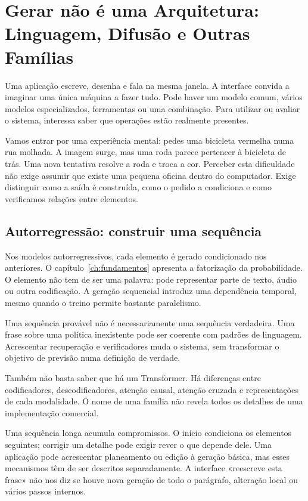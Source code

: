 \chapter{Gerar não é uma Arquitetura: Linguagem, Difusão e Outras Famílias}
\label{ch:generativos}

Uma aplicação escreve, desenha e fala na mesma janela. A interface convida a imaginar uma única máquina a fazer tudo. Pode haver um modelo comum, vários modelos especializados, ferramentas ou uma combinação. Para utilizar ou avaliar o sistema, interessa saber que operações estão realmente presentes.

Vamos entrar por uma experiência mental: pedes uma bicicleta vermelha numa rua molhada. A imagem surge, mas uma roda parece pertencer à bicicleta de trás. Uma nova tentativa resolve a roda e troca a cor. Perceber esta dificuldade não exige assumir que existe uma pequena oficina dentro do computador. Exige distinguir como a saída é construída, como o pedido a condiciona e como verificamos relações entre elementos.

\section{Autorregressão: construir uma sequência}
Nos modelos autorregressivos, cada elemento é gerado condicionado nos anteriores. O capítulo~\ref{ch:fundamentos} apresenta a fatorização da probabilidade. O elemento não tem de ser uma palavra: pode representar parte de texto, áudio ou outra codificação. A geração sequencial introduz uma dependência temporal, mesmo quando o treino permite bastante paralelismo.

Uma sequência provável não é necessariamente uma sequência verdadeira. Uma frase sobre uma política inexistente pode ser coerente com padrões de linguagem. Acrescentar recuperação e verificadores muda o sistema, sem transformar o objetivo de previsão numa definição de verdade.

Também não basta saber que há um Transformer. Há diferenças entre codificadores, descodificadores, atenção causal, atenção cruzada e representações de cada modalidade. O nome de uma família não revela todos os detalhes de uma implementação comercial.

Uma sequência longa acumula compromissos. O início condiciona os elementos seguintes; corrigir um detalhe pode exigir rever o que depende dele. Uma aplicação pode acrescentar planeamento ou edição à geração básica, mas esses mecanismos têm de ser descritos separadamente. A interface «reescreve esta frase» não nos diz se houve nova geração de todo o parágrafo, alteração local ou vários passos internos.

